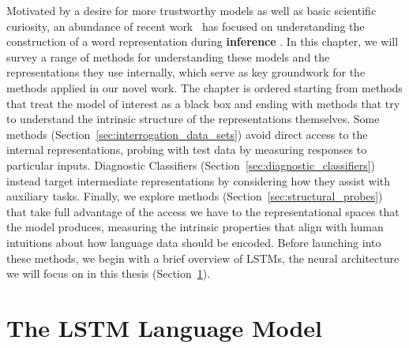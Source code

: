 Motivated by a desire for more trustworthy models as well as basic scientific curiosity, an abundance of recent work~{\citep{belinkov_analysis_2018,limisiewicz_syntax_2020}} has focused on understanding the construction of a word representation during \textbf{inference} . In this chapter, we will survey a range of methods for understanding these models and the representations they use internally, which serve as key groundwork for the methods applied in our novel work. The chapter is ordered starting from methods that treat the model of interest as a black box and ending with methods that try to understand the intrinsic structure of the representations themselves. Some methods (Section~\ref{sec:interrogation_data_sets}) avoid direct access to the internal representations, probing with test data by measuring responses to particular inputs. Diagnostic Classifiers (Section~\ref{sec:diagnostic_classifiers}) instead target intermediate representations by considering how they assist with auxiliary tasks. Finally, we explore methods (Section~\ref{sec:structural_probes}) that take full advantage of the  access we have to the representational spaces that the model produces, measuring the intrinsic properties that align with human intuitions about how language data should be encoded. Before launching into these methods, we begin with a brief overview of LSTMs, the neural architecture we will focus on in this thesis (Section~\ref{sec:lstm}).

\section{The LSTM Language Model} \label{sec:lstm}



